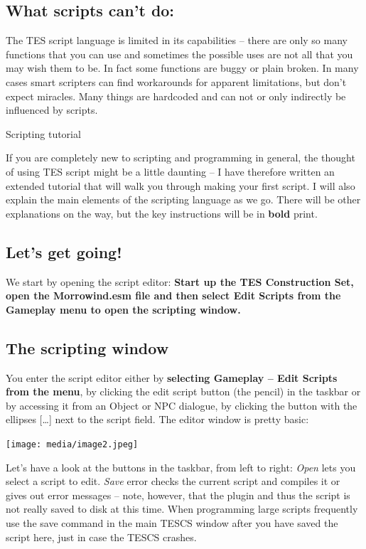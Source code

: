 \documentclass[
]{article}
\begin{document}
\hypertarget{what-scripts-cant-do}{%
\subsection{What scripts can't do:}\label{what-scripts-cant-do}}

The TES script language is limited in its capabilities -- there are only
so many functions that you can use and sometimes the possible uses are
not all that you may wish them to be. In fact some functions are buggy
or plain broken. In many cases smart scripters can find workarounds for
apparent limitations, but don't expect miracles. Many things are
hardcoded and can not or only indirectly be influenced by scripts.

\protect\hypertarget{_Toc53412554}{}{}Scripting tutorial

If you are completely new to scripting and programming in general, the
thought of using TES script might be a little daunting -- I have
therefore written an extended tutorial that will walk you through making
your first script. I will also explain the main elements of the
scripting language as we go. There will be other explanations on the
way, but the key instructions will be in \textbf{bold} print.

\hypertarget{lets-get-going}{%
\subsection{Let's get going!}\label{lets-get-going}}

We start by opening the script editor: \textbf{Start up the TES
Construction Set, open the Morrowind.esm file and then select Edit
Scripts from the Gameplay menu to open the scripting window.}

\hypertarget{the-scripting-window}{%
\subsection{The scripting window}\label{the-scripting-window}}

You enter the script editor either by \textbf{selecting Gameplay -- Edit
Scripts from the menu}, by clicking the edit script button (the pencil)
in the taskbar or by accessing it from an Object or NPC dialogue, by
clicking the button with the ellipses {[}\ldots{]} next to the script
field. The editor window is pretty basic:

\texttt{[image: media/image2.jpeg]}

Let's have a look at the buttons in the taskbar, from left to right:
\emph{Open} lets you select a script to edit. \emph{Save} error checks
the current script and compiles it or gives out error messages -- note,
however, that the plugin and thus the script is not really saved to disk
at this time. When programming large scripts frequently use the save
command in the main TESCS window after you have saved the script here,
just in case the TESCS crashes.
\end{document}
